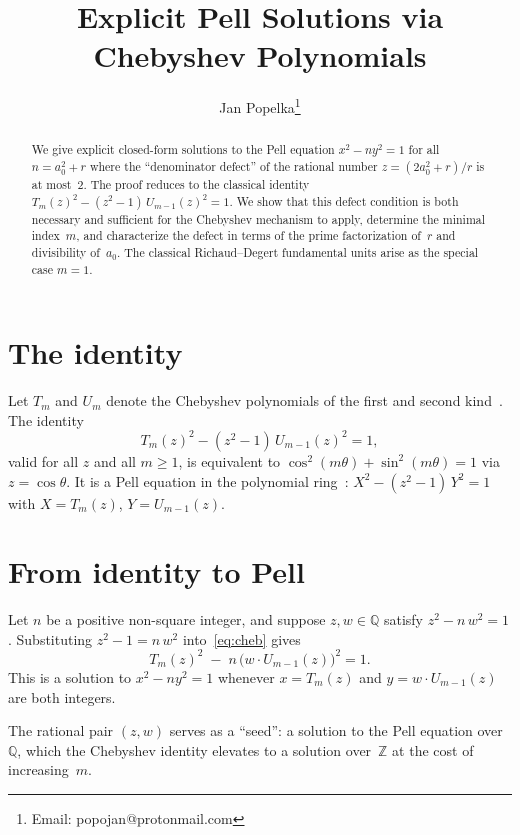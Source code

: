 \documentclass[11pt]{article}
\title{Explicit Pell Solutions via Chebyshev Polynomials}
\author{Jan Popelka\thanks{Email: popojan@protonmail.com}}
\date{}
\theoremstyle{definition}
\theoremstyle{remark}
\begin{document}
\maketitle

\begin{abstract}
We give explicit closed-form solutions to the Pell equation $x^2 - ny^2 = 1$
for all $n = a_0^2 + r$ where the ``denominator defect''
of the rational number $z = (2a_0^2+r)/r$ is at most~$2$.
The proof reduces to the classical identity
$T_m(z)^2 - (z^2-1)\,U_{m-1}(z)^2 = 1$.
We show that this defect condition is both necessary and sufficient
for the Chebyshev mechanism to apply, determine the minimal index~$m$,
and characterize the defect in terms of the prime factorization of~$r$
and divisibility of~$a_0$.
The classical Richaud--Degert fundamental units arise as the special
case $m = 1$.
\end{abstract}

\section{The identity}

Let $T_m$ and $U_m$ denote the Chebyshev polynomials of the first and second
kind~\cite{mason}.  The identity
\begin{equation}\label{eq:cheb}
T_m(z)^2 - (z^2 - 1)\,U_{m-1}(z)^2 = 1,
\end{equation}
valid for all $z$ and all $m \ge 1$, is equivalent to
$\cos^2(m\theta) + \sin^2(m\theta) = 1$ via $z = \cos\theta$.
It is a Pell equation in the polynomial ring~\cite{nathanson1976}:
$X^2 - (z^2-1)\,Y^2 = 1$ with $X = T_m(z)$, $Y = U_{m-1}(z)$.

\section{From identity to Pell}

Let $n$ be a positive non-square integer, and suppose $z, w \in \mathbb{Q}$
satisfy $z^2 - n\,w^2 = 1$.  Substituting $z^2 - 1 = n\,w^2$
into~\eqref{eq:cheb} gives
\begin{equation}\label{eq:pell}
T_m(z)^2 \;-\; n\,\bigl(w \cdot U_{m-1}(z)\bigr)^2 = 1.
\end{equation}
This is a solution to $x^2 - ny^2 = 1$ whenever
$x = T_m(z)$ and $y = w \cdot U_{m-1}(z)$ are both integers.

The rational pair $(z, w)$ serves as a ``seed'': a solution to the Pell
equation over~$\mathbb{Q}$, which the Chebyshev identity elevates to
a solution over~$\mathbb{Z}$ at the cost of increasing~$m$.
\end{document}
